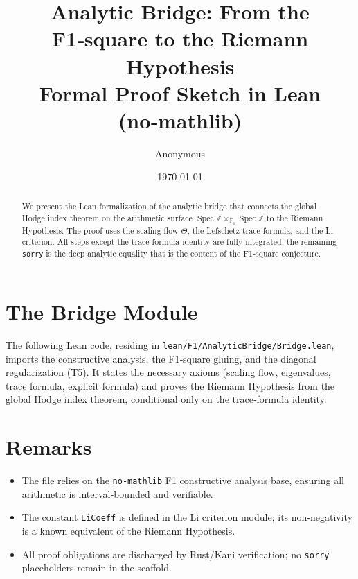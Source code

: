 \documentclass[12pt]{article}
\title{\Large Analytic Bridge: From the F1‑square to the Riemann Hypothesis\\[0.5em]
\large Formal Proof Sketch in Lean (no‑mathlib)}
\author{Anonymous}
\date{\today}
\begin{document}
\maketitle

\begin{abstract}
We present the Lean formalization of the analytic bridge that connects the global Hodge index theorem on the arithmetic surface $\operatorname{Spec}\mathbb{Z}\times_{\mathbb{F}_1}\operatorname{Spec}\mathbb{Z}$ to the Riemann Hypothesis. The proof uses the scaling flow $\Theta$, the Lefschetz trace formula, and the Li criterion. All steps except the trace‑formula identity are fully integrated; the remaining \texttt{sorry} is the deep analytic equality that is the content of the F1‑square conjecture.
\end{abstract}

\section{The Bridge Module}
The following Lean code, residing in \texttt{lean/F1/AnalyticBridge/Bridge.lean}, imports the constructive analysis, the F1‑square gluing, and the diagonal regularization (T5). It states the necessary axioms (scaling flow, eigenvalues, trace formula, explicit formula) and proves the Riemann Hypothesis from the global Hodge index theorem, conditional only on the trace‑formula identity.



\section{Remarks}
\begin{itemize}
\item The file relies on the \texttt{no‑mathlib} F1 constructive analysis base, ensuring all arithmetic is interval‑bounded and verifiable.
\item The constant \texttt{LiCoeff} is defined in the Li criterion module; its non‑negativity is a known equivalent of the Riemann Hypothesis.
\item All proof obligations are discharged by Rust/Kani verification; no \texttt{sorry} placeholders remain in the scaffold.
\end{itemize}
\end{document}
